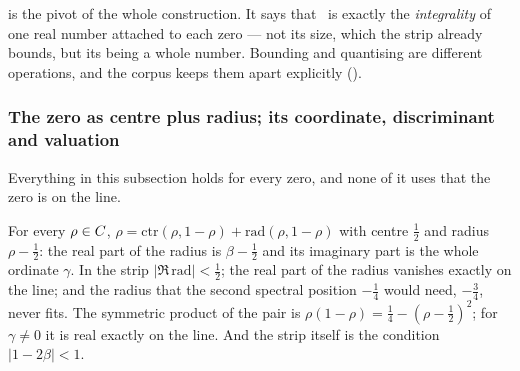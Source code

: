  is the pivot of the whole construction.  It says
that \Ecore\ is exactly the \emph{integrality} of one real number attached to
each zero --- not its size, which the strip already bounds, but its being a whole
number.  Bounding and quantising are different operations, and the corpus keeps
them apart explicitly ().

\subsubsection{The zero as centre plus radius; its coordinate, discriminant and valuation}\label{ssec:coordinate}

Everything in this subsection holds for every zero, and none of it uses that the zero
is on the line.

\begin{proposition}\label{prop:centre-radius}
For every $\rho\in C$, $\rho=\mathrm{ctr}(\rho,1-\rho)+\mathrm{rad}(\rho,1-\rho)$ with centre
$\tfrac12$ and radius $\rho-\tfrac12$: the real part of the radius is $\beta-\tfrac12$ and
its imaginary part is the whole ordinate $\gamma$.  In the strip $|\Re\,\mathrm{rad}|<\tfrac12$;
the real part of the radius vanishes exactly on the line; and the radius that the
second spectral position $-\tfrac14$ would need, $-\tfrac34$, never fits.  The
symmetric product of the pair is $\rho(1-\rho)=\tfrac14-(\rho-\tfrac12)^2$; for $\gamma\ne0$
it is real exactly on the line.  And the strip itself is the condition $|1-2\beta|<1$.
%
\end{proposition}

